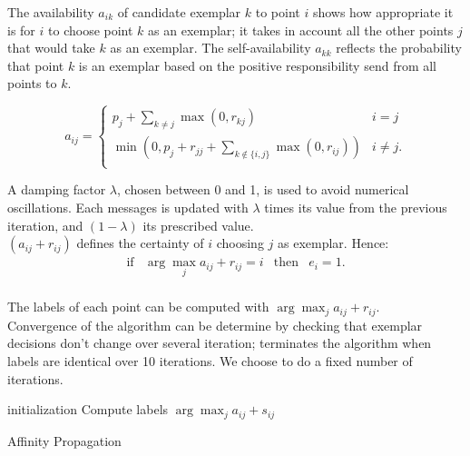 \documentclass{ipol}
\begin{document}
The availability $a_{ik}$ of candidate exemplar $k$ to point $i$ shows how
appropriate it is for $i$ to choose point $k$ as an exemplar; it takes in account
all the other points $j$ that would take $k$ as an exemplar. The
self-availability $a_{kk}$ reflects the probability that point $k$ is an
exemplar based on the positive responsibility send from all points to $k$.

\begin{equation*}
a_{ij} = \begin{cases}
	    p_j + \sum_{k \neq j} \max(0, r_{kj}) &  i = j \\
	    \min ( 0, p_j + r_{jj} + \sum_{k \notin \{i, j\} } \max (0, r_{ij}))
	    & i \neq j.\\
	 \end{cases}
\end{equation*}

A damping factor $\lambda$, chosen between 0 and 1, is used to avoid
numerical oscillations. Each messages is updated with $\lambda$ times its
value from the previous iteration, and $(1 - \lambda)$ its prescribed value.
\\

$(a_{ij} + r_{ij})$ defines the certainty of $i$ choosing $j$ as exemplar.
Hence:
\begin{equation*}
\begin{array}{cccc}
\text{if} & \arg \max_j a_{ij} + r_{ij} = i & \text{then} & e_i = 1. \\
\end{array}
\end{equation*}

The labels of each point can be computed with $\arg \max_j a_{ij} + r_{ij}$.
\\

Convergence of the algorithm can be determine by checking that exemplar
decisions don't change over several iteration;
\cite{frey07affinitypropagation} terminates the algorithm when labels are
identical over 10 iterations. We choose to do a fixed number of iterations.

\begin{algorithm}[h]
  \SetLine
  initialization\;
  Compute labels $\arg \max_{j} a_{ij} + s_{ij}$ \;
  \caption{Affinity Propagation}
\end{algorithm}
\end{document}

